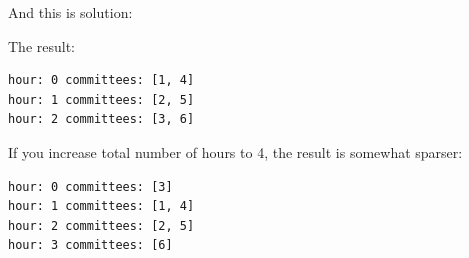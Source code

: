 And this is solution:



The result:

\begin{lstlisting}
hour: 0 committees: [1, 4]
hour: 1 committees: [2, 5]
hour: 2 committees: [3, 6]
\end{lstlisting}

If you increase total number of hours to 4, the result is somewhat sparser:

\begin{lstlisting}
hour: 0 committees: [3]
hour: 1 committees: [1, 4]
hour: 2 committees: [2, 5]
hour: 3 committees: [6]
\end{lstlisting}

